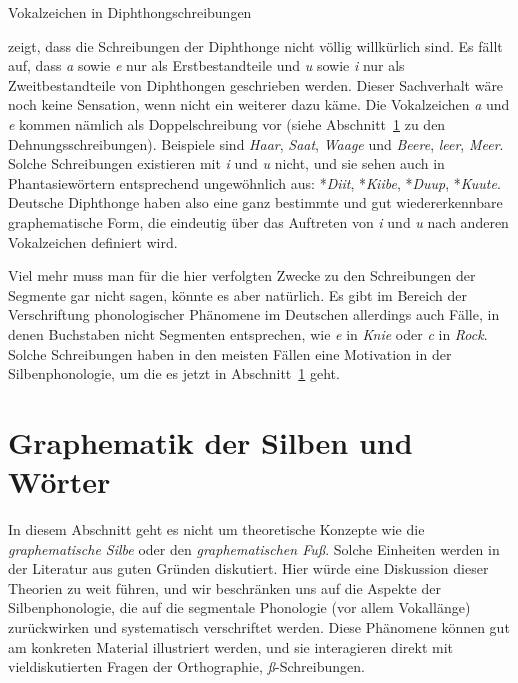 \begin{Vertiefung}{Vokalzeichen in Diphthongschreibungen}
\label{vert:diphthongschreibungen}

\noindent \citet[299]{Eisenberg2013a} zeigt, dass die Schreibungen der Diphthonge nicht völlig willkürlich sind.
Es fällt auf, dass \textit{a} sowie \textit{e} nur als Erstbestandteile und \textit{u} sowie \textit{i} nur als Zweitbestandteile von Diphthongen geschrieben werden.
Dieser Sachverhalt wäre noch keine Sensation, wenn nicht ein weiterer dazu käme.
Die Vokalzeichen \textit{a} und \textit{e} kommen nämlich als Doppelschreibung vor (siehe Abschnitt~\ref{sec:graphematikdersilbenundwoerter} zu den Dehnungsschreibungen).
Beispiele sind \textit{Haar}, \textit{Saat}, \textit{Waage} und \textit{Beere}, \textit{leer}, \textit{Meer}.
Solche Schreibungen existieren mit \textit{i} und \textit{u} nicht, und sie sehen auch in Phantasiewörtern entsprechend ungewöhnlich aus: *\textit{Diit}, *\textit{Kiibe}, *\textit{Duup}, *\textit{Kuute}.
Deutsche Diphthonge haben also eine ganz bestimmte und gut wiedererkennbare graphematische Form, die eindeutig über das Auftreten von \textit{i} und \textit{u} nach anderen Vokalzeichen definiert wird.
\end{Vertiefung}


Viel mehr muss man für die hier verfolgten Zwecke zu den Schreibungen der Segmente gar nicht sagen, könnte es aber natürlich.
Es gibt im Bereich der Verschriftung phonologischer Phänomene im Deutschen allerdings auch Fälle, in denen Buchstaben nicht Segmenten entsprechen, wie \textit{e} in \textit{Knie} oder \textit{c} in \textit{Rock}.
Solche Schreibungen haben in den meisten Fällen eine Motivation in der Silbenphonologie, um die es jetzt in Abschnitt~\ref{sec:graphematikdersilbenundwoerter} geht.



\section{Graphematik der Silben und Wörter}
\label{sec:graphematikdersilbenundwoerter}

In diesem Abschnitt geht es nicht um theoretische Konzepte wie die \textit{graphematische Silbe} oder den \textit{graphematischen Fuß}.
Solche Einheiten werden in der Literatur aus guten Gründen diskutiert.
Hier würde eine Diskussion dieser Theorien zu weit führen, und wir beschränken uns auf die Aspekte der Silbenphonologie, die auf die segmentale Phonologie (vor allem Vokallänge) zurückwirken und systematisch verschriftet werden.
Diese Phänomene können gut am konkreten Material illustriert werden, und sie interagieren direkt mit vieldiskutierten Fragen der Orthographie, \zB \textit{ß}-Schreibungen.

